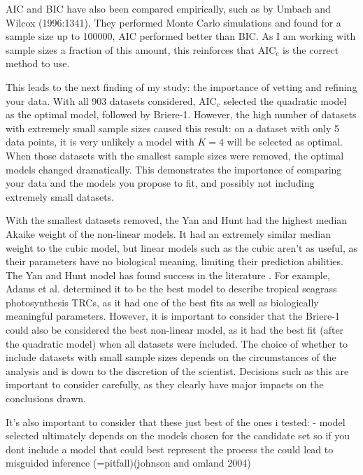 \documentclass[11pt, a4paper]{article}
\begin{document}
AIC and BIC have also been compared empirically, such as by Umbach and Wilcox (1996:1341). They performed Monte Carlo simulations and found for a sample size up to 100000, AIC performed better than BIC. As I am working with sample sizes a fraction of this amount, this reinforces that AIC$_c$ is the correct method to use.

This leads to the next finding of my study: the importance of vetting and refining your data. With all 903 datasets considered, AIC$_c$ selected the quadratic model as the optimal model, followed by Briere-1. However, the high number of datasets with extremely small sample sizes caused this result: on a dataset with only 5 data points, it is very unlikely a model with $K=4$ will be selected as optimal. When those datasets with the smallest sample sizes were removed, the optimal models changed dramatically. This demonstrates the importance of comparing your data and the models you propose to fit, and possibly not including extremely small datasets.

With the smallest datasets removed, the Yan and Hunt had the highest median Akaike weight of the non-linear models. It had an extremely similar median weight to the cubic model, but linear models such as the cubic aren't as useful, as their parameters have no biological meaning, limiting their prediction abilities. The Yan and Hunt model has found success in the literature \cite{adamsModelFitBiological2017, vanderheideSimpleEquationDescribing2006}. For example, Adams et al. \cite{adamsModelFitBiological2017} determined it to be the best model to describe tropical seagrass photosynthesis TRCs, as it had one of the best fits as well as biologically meaningful parameters. However, it is important to consider that the Briere-1 could also be considered the best non-linear model, as it had the best fit (after the quadratic model) when all datasets were included. The choice of whether to include datasets with small sample sizes depends on the circumstances of the analysis and is down to the discretion of the scientist. Decisions such as this are important to consider carefully, as they clearly have major impacts on the conclusions drawn.

It's also important to consider that these just best of the ones i tested: - model selected ultimately depends on the models chosen for the candidate set so if you dont include a model that could best represent the process the could lead to misguided inference (=pitfall)(johnson and omland 2004)
\end{document}

